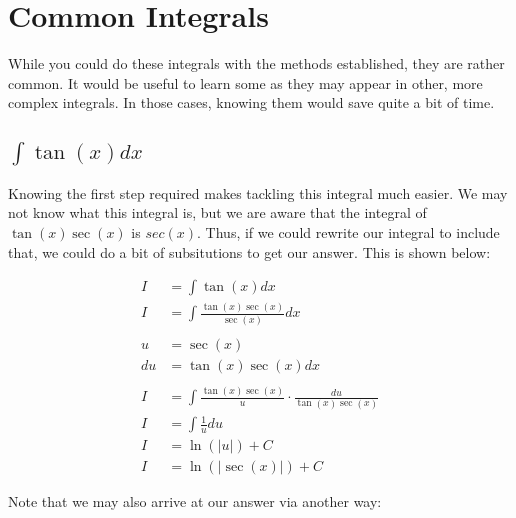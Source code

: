 \documentclass[12pt]{article}
\begin{document}
\section{Common Integrals}

While you could do these integrals with the methods established, they are rather common.
It would be useful to learn some as they may appear in other, more complex integrals.
In those cases, knowing them would save quite a bit of time.

\subsection{$\int \tan(x) dx$}

Knowing the first step required makes tackling this integral much easier.
We may not know what this integral is, but we are aware that the integral of $\tan(x)\sec(x)$ is $sec(x)$.
Thus, if we could rewrite our integral to include that, we could do a bit of subsitutions to get our answer.
This is shown below:


\begin{align}
    I  & = \int \tan(x) dx                                               \\
    I  & = \int \frac{\tan(x)\sec(x)}{\sec(x)} dx                        \\
    \nonumber                                                            \\
    u  & = \sec(x)                                                       \\
    du & = \tan(x)\sec(x) dx                                             \\
    \nonumber                                                            \\
    I  & = \int \frac{\tan(x)\sec(x)}{u} \cdot \frac{du}{\tan(x)\sec(x)} \\
    I  & = \int \frac{1}{u} du                                           \\
    I  & = \ln(|u|) + C                                                  \\
    I  & = \ln(|\sec(x)|) + C
\end{align}


Note that we may also arrive at our answer via another way:
\end{document}

